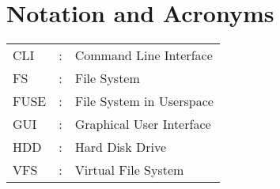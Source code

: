 \chapter*{Notation and Acronyms}
\vspace{1cm}

\noindent
\begin{tabular}{lcl}
    CLI &: & Command Line Interface \\
    FS &: & File System \\
    FUSE &: & File System in Userspace \\
    GUI &: & Graphical User Interface \\
    HDD &: & Hard Disk Drive \\
    VFS &: & Virtual File System \\
\end{tabular}
